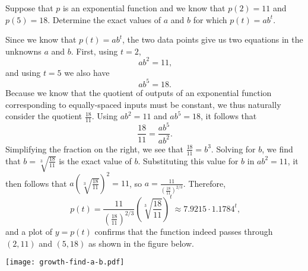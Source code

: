 \documentclass[nooutcomes]{ximera}
\begin{document}
\begin{example}\label{example:exp1}
Suppose that $p$ is an exponential function and we know that $p(2) = 11$ and $p(5) = 18$.  Determine the exact values of $a$ and $b$ for which $p(t) = ab^t$.

\begin{explanation}
Since we know that $p(t) = ab^t$, the two data points give us two equations in the unknowns $a$ and $b$.  First, using $t = 2$,%
\begin{equation*}
ab^2 = 11\text{,}
\end{equation*}
and using $t = 5$ we also have%
\begin{equation*}
ab^5 = 18\text{.}
\end{equation*}
Because we know that the quotient of outputs of an exponential function corresponding to equally-spaced inputs must be constant, we thus naturally consider the quotient $\frac{18}{11}$.  Using $ab^2 = 11$ and $ab^5 = 18$, it follows that%
\begin{equation*}
\frac{18}{11} = \frac{ab^5}{ab^2}\text{.}
\end{equation*}
Simplifying the fraction on the right, we see that $\frac{18}{11} = b^3$. Solving for $b$, we find that $b = \sqrt[3]{\frac{18}{11}}$ is the exact value of $b$.  Substituting this value for $b$ in $ab^2 = 11$, it then follows that $a \left( \sqrt[3]{\frac{18}{11}} \right)^2 = 11$, so $a = \frac{11}{\left( \frac{18}{11} \right)^{2/3}}$.  Therefore,%
\begin{equation*}
p(t) = \frac{11}{\left( \frac{18}{11} \right)^{2/3}} \left( \sqrt[3]{\frac{18}{11}} \right)^t \approx 7.9215 \cdot 1.1784^t\text{,}
\end{equation*}
and a plot of $y = p(t)$ confirms that the function indeed passes through $(2,11)$ and $(5,18)$ as shown in the figure below.

\begin{image}
\texttt{[image: growth-find-a-b.pdf]}
\end{image}

\end{explanation}
\end{example}
\end{document}
